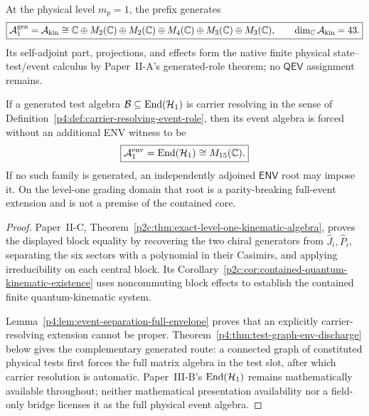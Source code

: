 \documentclass[12pt,a4paper]{article}
\begin{document}
\begin{theorem}
\label{p4:thm:full-finite-observable-algebra}
At the physical level \(m_p=1\), the prefix generates
\[
 \boxed{
 \mathcal A_1^{\rm gen}=\mathcal A_{\rm kin}
 \cong\mathbb{C}\oplus M_2(\mathbb{C})\oplus M_2(\mathbb{C})\oplus M_4(\mathbb{C})
       \oplus M_3(\mathbb{C})\oplus M_3(\mathbb{C}),
 \qquad \dim_{\mathbb{C}}\mathcal A_{\rm kin}=43.}
\]
Its self-adjoint part, projections, and effects form the native finite
physical state--test/event calculus by Paper~II-A's generated-role theorem;
no \(\mathsf{QEV}\) assignment remains.

If a generated test algebra \(\mathcal B\subseteq\operatorname{End}(\mathcal H_1)\) is
carrier resolving in the sense of
Definition~\ref{p4:def:carrier-resolving-event-role}, then its event algebra
is forced without an additional ENV witness to be
\[
 \boxed{\mathcal A_1^{\rm env}
 =\operatorname{End}(\mathcal H_1)\cong M_{15}(\mathbb{C}).}
\]
If no such family is generated, an independently adjoined
\(\mathsf{ENV}\) root may impose it.  On the level-one grading domain that
root is a parity-breaking full-event extension and is not a premise of the
contained core.
\end{theorem}


\begin{proof}
Paper~II-C, Theorem~\ref{p2c:thm:exact-level-one-kinematic-algebra}, proves
the displayed block equality by recovering the two chiral generators from
\(\widehat J_i,\widehat P_i\), separating the six sectors with a polynomial
in their Casimirs, and applying irreducibility on each central block.  Its
Corollary~\ref{p2c:cor:contained-quantum-kinematic-existence} uses
noncommuting block effects to establish the contained finite
quantum-kinematic system.

Lemma~\ref{p4:lem:event-separation-full-envelope} proves that an explicitly
carrier-resolving extension cannot be proper.  Theorem~\ref{p4:thm:test-graph-env-discharge}
below gives the complementary generated route: a connected graph of
constituted physical tests first forces the full matrix algebra in the test
slot, after which carrier resolution is automatic.  Paper~III-B's
\(\operatorname{End}(\mathcal H_1)\) remains mathematically available throughout; neither
mathematical presentation availability nor a field-only bridge licenses it as
the full physical event algebra.
\end{proof}
\end{document}
